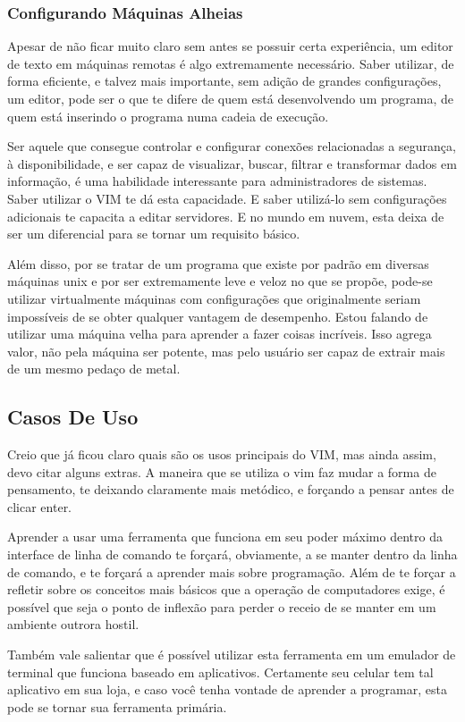 \documentclass[a4paper, 12pt]{article}
\begin{document}
\subsubsection{Configurando Máquinas Alheias}
Apesar de não ficar muito claro sem antes se possuir certa experiência, um editor de texto em máquinas remotas é algo extremamente necessário.
Saber utilizar, de forma eficiente, e talvez mais importante, sem adição de grandes configurações, um editor, pode ser o que te difere de quem está desenvolvendo um programa, de quem está inserindo o programa numa cadeia de execução.

Ser aquele que consegue controlar e configurar conexões relacionadas a segurança, à disponibilidade, e ser capaz de visualizar, buscar, filtrar e transformar dados em informação, é uma habilidade interessante para administradores de sistemas.
Saber utilizar o VIM te dá esta capacidade. E saber utilizá-lo sem configurações adicionais te capacita a editar servidores. E no mundo em nuvem, esta deixa de ser um diferencial para se tornar um requisito básico.

Além disso, por se tratar de um programa que existe por padrão em diversas máquinas unix e por ser extremamente leve e veloz no que se propõe, pode-se utilizar virtualmente máquinas com configurações que originalmente seriam impossíveis de se obter qualquer vantagem de desempenho.
Estou falando de utilizar uma máquina velha para aprender a fazer coisas incríveis.
Isso agrega valor, não pela máquina ser potente, mas pelo usuário ser capaz de extrair mais de um mesmo pedaço de metal.
\subsection{Casos De Uso}
Creio que já ficou claro quais são os usos principais do VIM, mas ainda assim, devo citar alguns extras.
A maneira que se utiliza o vim faz mudar a forma de pensamento, te deixando claramente mais metódico, e forçando a pensar antes de clicar enter.

Aprender a usar uma ferramenta que funciona em seu poder máximo dentro da interface de linha de comando te forçará, obviamente, a se manter dentro da linha de comando, e te forçará a aprender mais sobre programação.
Além de te forçar a refletir sobre os conceitos mais básicos que a operação de computadores exige, é possível que seja o ponto de inflexão para perder o receio de se manter em um ambiente outrora hostil.

Também vale salientar que é possível utilizar esta ferramenta em um emulador de terminal que funciona baseado em aplicativos.
Certamente seu celular tem tal aplicativo em sua loja, e caso você tenha vontade de aprender a programar, esta pode se tornar sua ferramenta primária.
\end{document}
